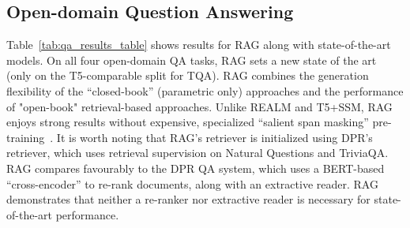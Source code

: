 \documentclass{article}
\begin{document}
\begin{table}[t]
\begin{minipage}[b]{0.49\linewidth}
    \label{tab:qa_results_table}
\end{minipage}
\hspace{0.01\linewidth}
\begin{minipage}[b]{0.49\linewidth}
\centering
  \caption{Generation and classification Test Scores.  MS-MARCO SotA is \cite{Bi2020PALMPA}, FEVER-3 is \cite{Zhong2019ReasoningOS} and FEVER-2 is \cite{Thorne2020AvoidingCF} *Uses gold context/evidence. Best model without gold access underlined. 
    }
    \vspace{13pt}
 \small
    \addtolength{\tabcolsep}{-3pt}   
    \addtolength{\tabcolsep}{3pt}    

    \label{tab:generations}
    \end{minipage}
\end{table}












\subsection{Open-domain Question Answering}

Table~\ref{tab:qa_results_table} shows results for RAG along with state-of-the-art models. On all four open-domain QA tasks, RAG sets a new state of the art 
(only on the T5-comparable split for TQA).
RAG combines the generation flexibility of the ``closed-book'' (parametric only) approaches and the performance of "open-book" retrieval-based approaches. 
Unlike REALM and T5+SSM, RAG enjoys strong results without expensive, specialized ``salient span masking'' pre-training~\cite{guu2020realm}.
It is worth noting that RAG's retriever is initialized using DPR's retriever, which uses retrieval supervision on Natural Questions and TriviaQA.
RAG compares favourably to the DPR QA system, which uses a BERT-based ``cross-encoder'' to re-rank documents, along with an extractive reader. RAG demonstrates that neither a re-ranker nor extractive reader is necessary for state-of-the-art performance. 
\end{document}
